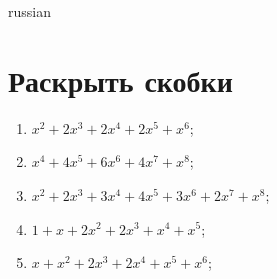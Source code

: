 \documentclass[20pt,a4paper]{article}
\begin{document}
\begin{otherlanguage*}{russian}

\section{Раскрыть скобки}
\begin{enumerate}
\item $x^2 + 2x^3 + 2x^4 + 2x^5 + x^6$;
\item $x^4 + 4x^5 + 6x^6 + 4x^7 + x^8$;
\item $x^2 + 2x^3 + 3x^4 + 4x^5 + 3x^6 + 2x^7 + x^8$;
\item $1 + x + 2x^2 + 2x^3 + x^4 + x^5$;
\item $x + x^2 + 2x^3 + 2x^4 + x^5 + x^6$;
\end{enumerate}
\end{otherlanguage*}
\end{document}
